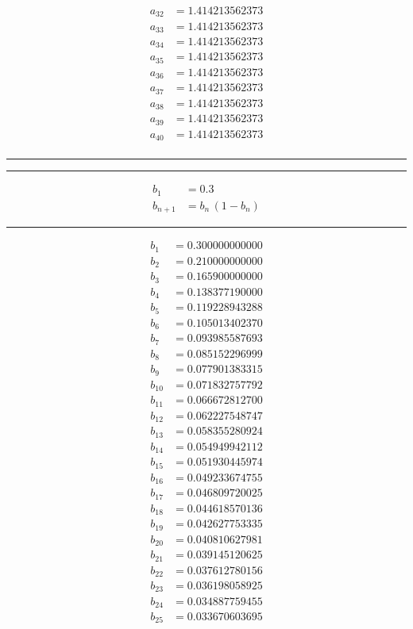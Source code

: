 \documentclass[10pt,letterpaper]{article}
\begin{document}
\begin{multicols}{4}
\begin{align*}
a_{32} &= 1.414213562373 \\
a_{33} &= 1.414213562373 \\
a_{34} &= 1.414213562373 \\
a_{35} &= 1.414213562373 \\
a_{36} &= 1.414213562373 \\
a_{37} &= 1.414213562373 \\
a_{38} &= 1.414213562373 \\
a_{39} &= 1.414213562373 \\
a_{40} &= 1.414213562373 \\
\end{align*}
\vfill
\columnbreak
\hrule
\hrule
\begin{align*}
b_1 &= 0.3 \\
b_{n+1} &= b_n \, (1-b_n)
\end{align*}
\hrule
\begin{align*}
b_{1} &= 0.300000000000 \\
b_{2} &= 0.210000000000 \\
b_{3} &= 0.165900000000 \\
b_{4} &= 0.138377190000 \\
b_{5} &= 0.119228943288 \\
b_{6} &= 0.105013402370 \\
b_{7} &= 0.093985587693 \\
b_{8} &= 0.085152296999 \\
b_{9} &= 0.077901383315 \\
b_{10} &= 0.071832757792 \\
b_{11} &= 0.066672812700 \\
b_{12} &= 0.062227548747 \\
b_{13} &= 0.058355280924 \\
b_{14} &= 0.054949942112 \\
b_{15} &= 0.051930445974 \\
b_{16} &= 0.049233674755 \\
b_{17} &= 0.046809720025 \\
b_{18} &= 0.044618570136 \\
b_{19} &= 0.042627753335 \\
b_{20} &= 0.040810627981 \\
b_{21} &= 0.039145120625 \\
b_{22} &= 0.037612780156 \\
b_{23} &= 0.036198058925 \\
b_{24} &= 0.034887759455 \\
b_{25} &= 0.033670603695 \\

\end{align*}
\end{multicols}
\end{document}
